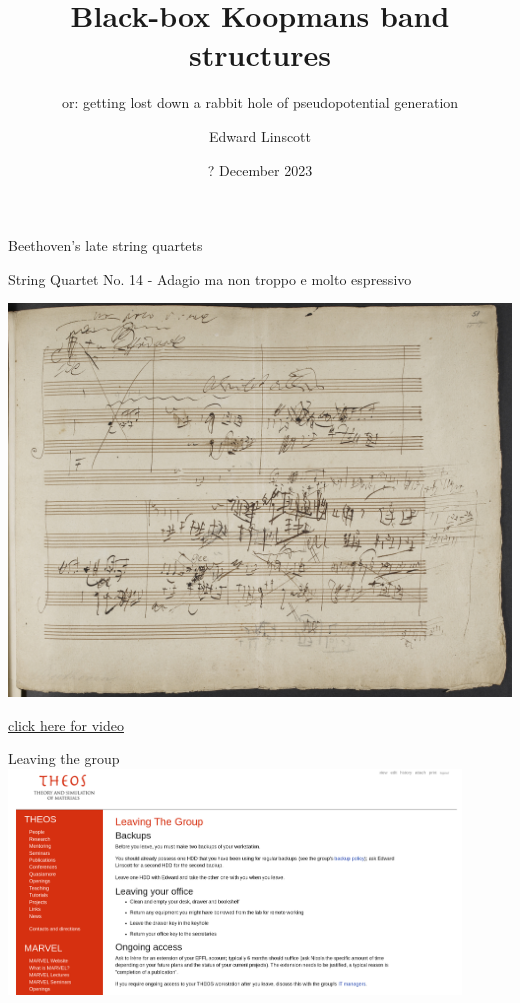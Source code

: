 \documentclass[xcolor=table,aspectratio=169]{beamer}
\author{Edward Linscott}
\institute{PSI}
\date{? December 2023}
\title{Black-box Koopmans band structures}
\subtitle{or: getting lost down a rabbit hole of pseudopotential generation}
\numberwithin{equation}{section}
\begin{document}
\begin{frame}{Beethoven's late string quartets}
    \centering

    String Quartet No. 14 - Adagio ma non troppo e molto espressivo

    \vspace{6pt}

    \includegraphics[height=0.6\paperheight]{photos/beethoven.jpg}

    {\tiny \href{https://www.youtube.com/watch?v=JE_crvhG3Co\&t=454s\&ab_channel=DavidSukonick\#t=4m27s}{click here for video}}



\end{frame}

\begin{frame}{Leaving the group}
    \centering
    \includegraphics[width=0.9\textwidth]{figures/leaving_the_group.png}
\end{frame}
\end{document}
